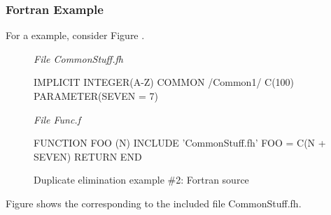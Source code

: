 \subsubsection{Fortran Example}


For a 
example, consider 
Figure .

\begin{figure}[ht]
\textit{File CommonStuff.f\hspace{1pt}h}
\begin{nlnlisting}
IMPLICIT INTEGER(A-Z)
COMMON /Common1/ C(100)
PARAMETER(SEVEN = 7)
\end{nlnlisting}

\textit{File Func.f}
\begin{nlnlisting}
FUNCTION FOO (N)
INCLUDE 'CommonStuff.fh'
FOO = C(N + SEVEN)
RETURN
END
\end{nlnlisting}
\caption{Duplicate elimination example \#2: Fortran source} 
\label{fig:duplicateeliminationexample2fortransource}
\end{figure}


Figure 
shows the 
corresponding to the included file 
CommonStuff.fh.

